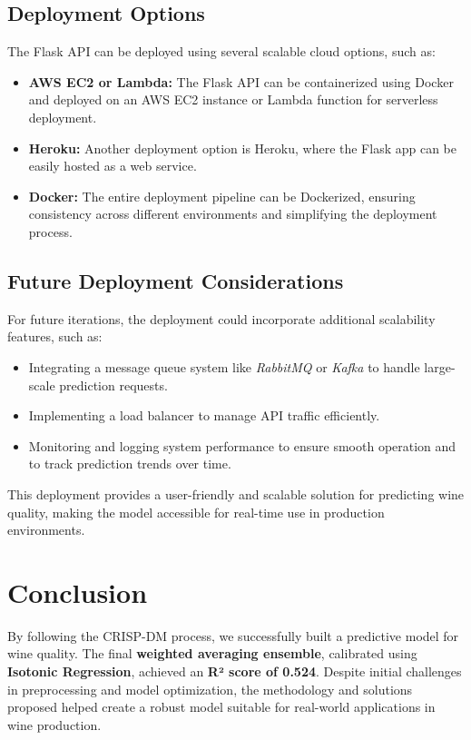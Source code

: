 \documentclass{article}
\begin{document}
\subsection{Deployment Options}
The Flask API can be deployed using several scalable cloud options, such as:
\begin{itemize}
    \item \textbf{AWS EC2 or Lambda:} The Flask API can be containerized using Docker and deployed on an AWS EC2 instance or Lambda function for serverless deployment.
    \item \textbf{Heroku:} Another deployment option is Heroku, where the Flask app can be easily hosted as a web service.
    \item \textbf{Docker:} The entire deployment pipeline can be Dockerized, ensuring consistency across different environments and simplifying the deployment process.
\end{itemize}

\subsection{Future Deployment Considerations}
For future iterations, the deployment could incorporate additional scalability features, such as:
\begin{itemize}
    \item Integrating a message queue system like \textit{RabbitMQ} or \textit{Kafka} to handle large-scale prediction requests.
    \item Implementing a load balancer to manage API traffic efficiently.
    \item Monitoring and logging system performance to ensure smooth operation and to track prediction trends over time.
\end{itemize}

This deployment provides a user-friendly and scalable solution for predicting wine quality, making the model accessible for real-time use in production environments.


\section{Conclusion}
By following the CRISP-DM process, we successfully built a predictive model for wine quality. The final \textbf{weighted averaging ensemble}, calibrated using \textbf{Isotonic Regression}, achieved an \textbf{R² score of 0.524}. Despite initial challenges in preprocessing and model optimization, the methodology and solutions proposed helped create a robust model suitable for real-world applications in wine production.
\end{document}
